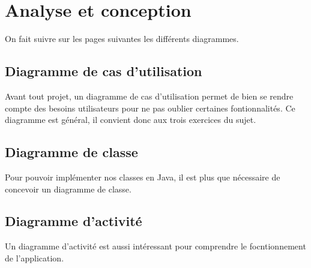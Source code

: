 \section{Analyse et conception}
On fait suivre sur les pages suivantes les différents diagrammes.
\subsection{Diagramme de cas d'utilisation}


Avant tout projet, un diagramme de cas d'utilisation permet de bien se rendre compte des besoins utilisateurs pour ne pas oublier certaines fontionnalités. Ce diagramme est général, il convient donc aux trois exercices du sujet.

\subsection{Diagramme de classe}

Pour pouvoir implémenter nos classes en Java, il est plus que nécessaire de concevoir un diagramme de classe.

\subsection{Diagramme d'activité}
Un diagramme d'activité est aussi intéressant pour comprendre le focntionnement de l'application.











